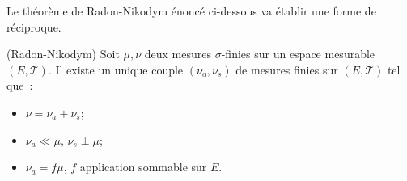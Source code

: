 Le théorème de Radon-Nikodym énoncé ci-dessous va établir une forme de
réciproque.
\begin{mandatory}
\begin{theorem}{(Radon-Nikodym)}
Soit $\mu, \nu$ deux mesures $\sigma$-finies sur un espace mesurable $(E,
\mathcal{T})$. Il existe un unique couple $(\nu_a, \nu_s)$ de mesures
finies sur $(E, \mathcal{T})$ tel que~:
\begin{itemize}
\item $\nu = \nu_a + \nu_s$;
\item $\nu_a \ll \mu, \, \nu_s \perp \mu$;
\item $\nu_a = f \mu$, $f$ application sommable sur
$E$.
\end{itemize}
\end{theorem}
\end{mandatory}
